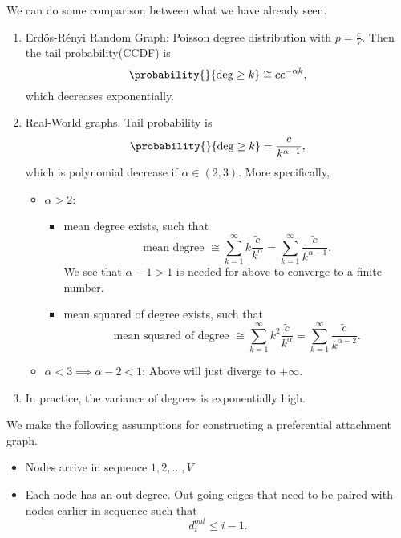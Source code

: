 \begin{remark}
	We can do some comparison between what we have already seen.
	\begin{enumerate}
		\item Erdős-Rényi Random Graph: Poisson degree distribution with \(p = \frac{c}{V}\). Then the tail probability(CCDF) is
		      \[
			      \probability{}{\deg\geq k}\cong c e^{-\alpha k},
		      \]
		      which decreases exponentially.
		\item Real-World graphs. Tail probability is
		      \[
			      \probability{}{\deg\geq k} = \frac{c}{k^{\alpha - 1}},
		      \]
		      which is polynomial decrease if \(\alpha\in(2, 3)\). More specifically,
		      \begin{itemize}
			      \item \(\alpha>2\):
			            \begin{itemize}
				            \item mean degree exists, such that
				                  \[
					                  \text{mean degree }\cong \sum\limits_{k=1}^{\infty} k \frac{\widetilde{c}}{k^{\alpha}} = \sum\limits_{k=1}^{\infty} \frac{\widetilde{c}}{k^{\alpha - 1}}.
				                  \]
				                  We see that \(\alpha - 1 > 1\) is needed for above to converge to a finite number.
				            \item mean squared of degree exists, such that
				                  \[
					                  \text{mean squared of degree }\cong \sum\limits_{k=1}^{\infty} k^2 \frac{\widetilde{c}}{k^{\alpha}} = \sum\limits_{k=1}^{\infty} \frac{\widetilde{c}}{k^{\alpha-2}}.
				                  \]
			            \end{itemize}
			      \item \(\alpha<3 \implies \alpha - 2 < 1\): Above will just diverge to \(+\infty\).
		      \end{itemize}
		\item In practice, the variance of degrees is exponentially high.
	\end{enumerate}
\end{remark}

\hr

We make the following assumptions for constructing a preferential attachment graph.
\begin{itemize}
	\item Nodes arrive in sequence \(1, 2, \ldots , V\)
	\item Each node has an out-degree. Out going edges that need to be paired with nodes earlier in sequence such that
	      \[
		      d_{i}^{out} \leq i - 1.
	      \]
\end{itemize}

